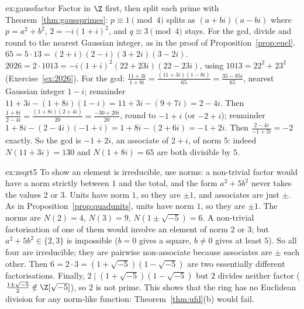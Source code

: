 \begin{solution}{ex:gaussfactor}
\idea Factor in $\Z$ first, then split each prime with Theorem~\ref{thm:gaussprimes}: $p\equiv1\pmod4$ splits as $(a+bi)(a-bi)$ where $p=a^2+b^2$, $2=-i(1+i)^2$, and $q\equiv3\pmod4$ stays. For the gcd, divide and round to the nearest Gaussian integer, as in the proof of Proposition~\ref{prop:eucl}.
\writeup $65=5\cdot13=(2+i)(2-i)(3+2i)(3-2i)$. $2026=2\cdot1013=-i(1+i)^2(22+23i)(22-23i)$, using $1013=22^2+23^2$ (Exercise~\ref{ex:2026}). For the gcd: $\frac{11+3i}{1+8i}=\frac{(11+3i)(1-8i)}{65}=\frac{35-85i}{65}$, nearest Gaussian integer $1-i$; remainder $11+3i-(1+8i)(1-i)=11+3i-(9+7i)=2-4i$. Then $\frac{1+8i}{2-4i}=\frac{(1+8i)(2+4i)}{20}=\frac{-30+20i}{20}$, round to $-1+i$ (or $-2+i$); remainder $1+8i-(2-4i)(-1+i)=1+8i-(2+6i)=-1+2i$. Then $\frac{2-4i}{-1+2i}=-2$ exactly. So the gcd is $-1+2i$, an associate of $2+i$, of norm $5$: indeed $N(11+3i)=130$ and $N(1+8i)=65$ are both divisible by $5$.
\end{solution}

\begin{solution}{ex:zsqrt5}
\idea To show an element is irreducible, use norms: a non-trivial factor would have a norm strictly between $1$ and the total, and the form $a^2+5b^2$ never takes the values $2$ or $3$. Units have norm $1$, so they are $\pm1$, and associates are just $\pm$.
\writeup As in Proposition~\ref{prop:quadunits}, units have norm $1$, so they are $\pm1$. The norms are $N(2)=4$, $N(3)=9$, $N(1\pm\sqrt{-5})=6$. A non-trivial factorisation of one of them would involve an element of norm $2$ or $3$; but $a^2+5b^2\in\{2,3\}$ is impossible ($b=0$ gives a square, $b\ne0$ gives at least $5$). So all four are irreducible; they are pairwise non-associate because associates are $\pm$ each other. Then $6=2\cdot3=(1+\sqrt{-5})(1-\sqrt{-5})$ are two essentially different factorisations. Finally, $2\mid(1+\sqrt{-5})(1-\sqrt{-5})$ but $2$ divides neither factor ($\frac{1\pm\sqrt{-5}}2\notin\Z[\sqrt{-5}]$), so $2$ is not prime. This shows that the ring has no Euclidean division for any norm-like function: Theorem~\ref{thm:ufd}(b) would fail.
\end{solution}

